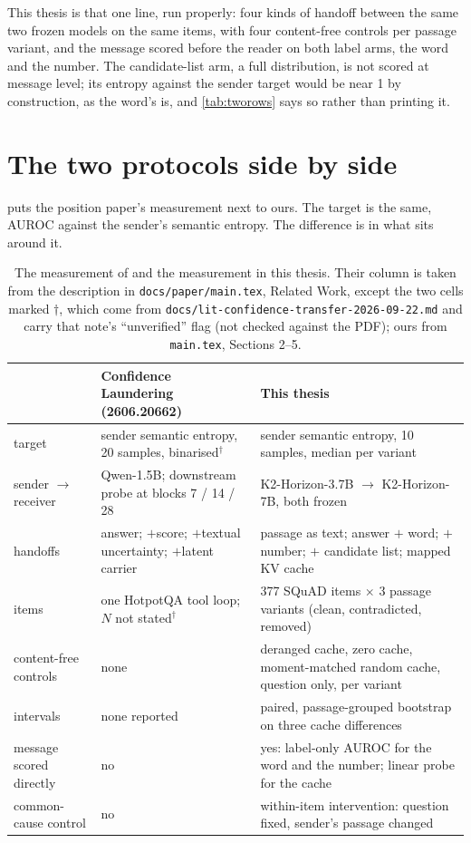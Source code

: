 \documentclass[11pt,a4paper]{report}
\begin{document}
This thesis is that one line, run properly: four kinds of handoff between the same two frozen models on the same items, with four content-free controls per passage variant, and the message scored before the reader on both label arms, the word and the number. The candidate-list arm, a full distribution, is not scored at message level; its entropy against the sender target would be near 1 by construction, as the word's is, and \cref{tab:tworows} says so rather than printing it.

\section{The two protocols side by side}

 puts the position paper's measurement next to ours. The target is the same, AUROC against the sender's semantic entropy. The difference is in what sits around it.

\begin{table}[h]
\caption{The measurement of \citet{2606.20662} and the measurement in this thesis. Their column is taken from the description in \texttt{docs/paper/main.tex}, Related Work, except the two cells marked $\dagger$, which come from \texttt{docs/lit-confidence-transfer-2026-09-22.md} and carry that note's ``unverified'' flag (not checked against the PDF); ours from \texttt{main.tex}, Sections 2--5.}
\label{tab:protocols}
\vskip 0.1in
\centering
\small
\begin{tabular}{p{2.9cm}p{5.1cm}p{6.1cm}}
\toprule
 & Confidence Laundering (2606.20662) & This thesis \\
\midrule
target & sender semantic entropy, 20 samples, binarised$^\dagger$ & sender semantic entropy, 10 samples, median per variant \\
sender $\to$ receiver & Qwen-1.5B; downstream probe at blocks 7 / 14 / 28 & K2-Horizon-3.7B $\to$ K2-Horizon-7B, both frozen \\
handoffs & answer; $+$score; $+$textual uncertainty; $+$latent carrier & passage as text; answer $+$ word; $+$ number; $+$ candidate list; mapped KV cache \\
items & one HotpotQA tool loop; $N$ not stated$^\dagger$ & 377 SQuAD items $\times$ 3 passage variants (clean, contradicted, removed) \\
content-free controls & none & deranged cache, zero cache, moment-matched random cache, question only, per variant \\
intervals & none reported & paired, passage-grouped bootstrap on three cache differences \\
message scored directly & no & yes: label-only AUROC for the word and the number; linear probe for the cache \\
common-cause control & no & within-item intervention: question fixed, sender's passage changed \\
\bottomrule
\end{tabular}
\end{table}
\end{document}
